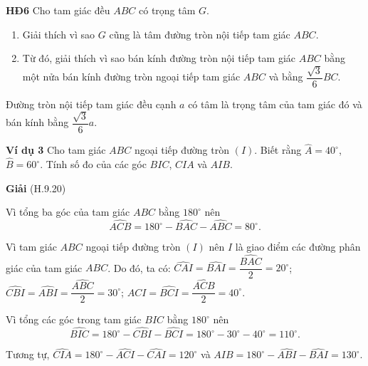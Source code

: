 \begin{lesson}
    \textbf{HĐ6} Cho tam giác đều $ABC$ có trọng tâm $G$.
    \begin{enumerate}[label=\alph*)]
        \item Giải thích vì sao $G$ cũng là tâm đường tròn nội tiếp tam giác $ABC$.

        \answerline
        \answerline
        \item Từ đó, giải thích vì sao bán kính đường tròn nội tiếp tam giác $ABC$ bằng một nửa bán kính đường tròn ngoại tiếp tam giác $ABC$ và bằng $\dfrac{\sqrt3}{6}BC$.

        \answerline
        \answerline
    \end{enumerate}

    \begin{keyconcept}
        Đường tròn nội tiếp tam giác đều cạnh $a$ có tâm là trọng tâm của tam giác đó và bán kính bằng $\dfrac{\sqrt3}{6}a$.
    \end{keyconcept}

    \textbf{Ví dụ 3} Cho tam giác $ABC$ ngoại tiếp đường tròn $(I)$. Biết rằng $\widehat{A}=40^\circ$, $\widehat{B}=60^\circ$. Tính số đo của các góc $BIC$, $CIA$ và $AIB$.

    \textbf{Giải} (H.9.20)

    Vì tổng ba góc của tam giác $ABC$ bằng $180^\circ$ nên
    \[
        \widehat{ACB}=180^\circ-\widehat{BAC}-\widehat{ABC}=80^\circ.
    \]

    Vì tam giác $ABC$ ngoại tiếp đường tròn $(I)$ nên $I$ là giao điểm các đường phân giác của tam giác $ABC$. Do đó, ta có: $\widehat{CAI}=\widehat{BAI}=\dfrac{\widehat{BAC}}{2}=20^\circ$; $\widehat{CBI}=\widehat{ABI}=\dfrac{\widehat{ABC}}{2}=30^\circ$; $\widehat{ACI}=\widehat{BCI}=\dfrac{\widehat{ACB}}{2}=40^\circ$.

    Vì tổng các góc trong tam giác $BIC$ bằng $180^\circ$ nên
    \[
        \widehat{BIC}=180^\circ-\widehat{CBI}-\widehat{BCI}=180^\circ-30^\circ-40^\circ=110^\circ.
    \]

    Tương tự, $\widehat{CIA}=180^\circ-\widehat{ACI}-\widehat{CAI}=120^\circ$ và $\widehat{AIB}=180^\circ-\widehat{ABI}-\widehat{BAI}=130^\circ$.

    \begin{center}


\end{center}
\end{lesson}
